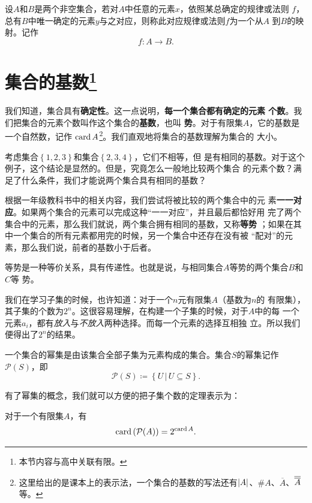 \begin{rawdef}[映射]
    设$A$和$B$是两个非空集合，若对$A$中任意的元素$x$，依照某总确定的规律或法则
    $f$，总有$B$中唯一确定的元素$y$与之对应，则称此对应规律或法则$f$为一个从$A$
    到$B$的映射。记作
    \[
        f: A \to B.
    \]
\end{rawdef}

\section[集合的基数]{集合的基数\footnote{本节内容与高中关联有限。}}

我们知道，集合具有\textbf{确定性}。这一点说明，\textbf{每一个集合都有确定的元素
个数}。我们把集合的元素个数叫作这个集合的\textbf{基数}，也叫
\textbf{势}。对于有限集$A$，它的基数是一个自然数，记作
$\operatorname{card}{A}$\footnote{这里给出的是课本上的表示法，一个集合的基数的写法还有$\left|{A}\right|
$、$\# A$、$\overline{A}$、$\overline{\overline{{A}}}$等。}。我们直观地将集合的基数理解为集合的
大小。

考虑集合$\left\{ 1,2,3 \right\} $和集合$\left\{ 2,3,4 \right\} $，它们不相等，但
是有相同的基数。对于这个例子，这个结论是显然的。但是，究竟怎么一般地比较两个集合
的元素个数？满足了什么条件，我们才能说两个集合具有相同的基数？

根据一年级教科书中的相关内容\cite{pep_math_1A}，我们尝试将被比较的两个集合中的元
素\textbf{一一对应}。如果两个集合的元素可以完成这种“一一对应”，并且最后都恰好用
完了两个集合中的元素，那么我们就说，两个集合拥有相同的基数，又称\textbf{等势}
；如果在其中一个集合的所有元素都用完的时候，另一个集合中还存在没有被
“配对”的元素，那么我们说，前者的基数小于后者。

等势是一种等价关系，具有传递性。也就是说，与相同集合$A$等势的两个集合$B$和$C$等
势。

我们在学习子集的时候，也许知道：对于一个$n$元有限集$A$（基数为$n$的
有限集），其子集的个数为$2^n$。这很容易理解，在构建一个子集的时候，对于$A$中的每
一个元素$a_i$，都有\emph{放入}与\emph{不放入}两种选择。而每一个元素的选择互相独
立。所以我们便得出了$2^n$的结果。

\begin{rawdef}[幂集]
    一个集合的幂集是由该集合全部子集为元素构成的集合。集合$S$的幂集记作
    $\mathcal{P}(S)$，即
    \[
        \mathcal{P}(S)\coloneqq \left\{ U \,|\, U \subseteq S \right\}.
    \]
\end{rawdef}

有了幂集的概念，我们就可以方便的把子集个数的定理表示为：
\begin{rawthm}
    对于一个有限集$A$，有
    \[
        \operatorname{card} \left( \mathcal{P}(A) \right) = 2^{\operatorname{card} A}.
    \]
\end{rawthm}


